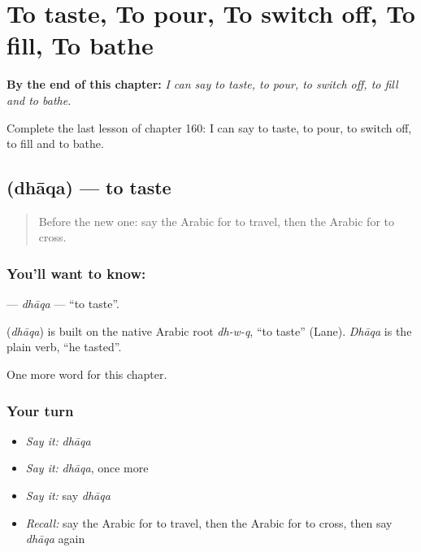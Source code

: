 
\chapter{To taste, To pour, To switch off, To fill, To bathe}
\label{ch:ar-to-taste-to-pour-to-switch-off-to-fill-to-bathe}

\begin{chapteropening}
\textbf{By the end of this chapter:} \emph{I can say to taste, to pour, to switch off, to fill and to bathe.}

Complete the last lesson of chapter 160: I can say to taste, to pour, to switch off, to fill and to bathe.
\end{chapteropening}

\section[\texorpdfstring{\ar{ذاق} (dhāqa)}{ذاق (dhāqa)}]{ (dhāqa) — to taste}

\label{lesson:AR-C160-dhaqa}



\begin{quote}
Before the new one: say the Arabic for to travel, then the Arabic for to cross.
\end{quote}

\subsection*{You'll want to know: }
\textbf{} — \emph{dhāqa} — \textquotedblleft{}to taste\textquotedblright{}.

\begin{cousinweb}
\textbf{} (\emph{dhāqa}) is built on the native Arabic root \emph{dh-w-q}, \textquotedblleft{}to taste\textquotedblright{} (Lane). \emph{Dhāqa} is the plain verb, \textquotedblleft{}he tasted\textquotedblright{}.
\end{cousinweb}

\begin{grammarlens}[title={What you've built}]
One more word for this chapter.
\end{grammarlens}

\subsection*{Your turn}
\begin{itemize}
\raggedright
  \item \emph{Say it:} \emph{dhāqa}
  \item \emph{Say it:} \emph{dhāqa}, once more
  \item \emph{Say it:} say \emph{dhāqa}
  \item \emph{Recall:} say the Arabic for to travel, then the Arabic for to cross, then say \emph{dhāqa} again
\end{itemize}

